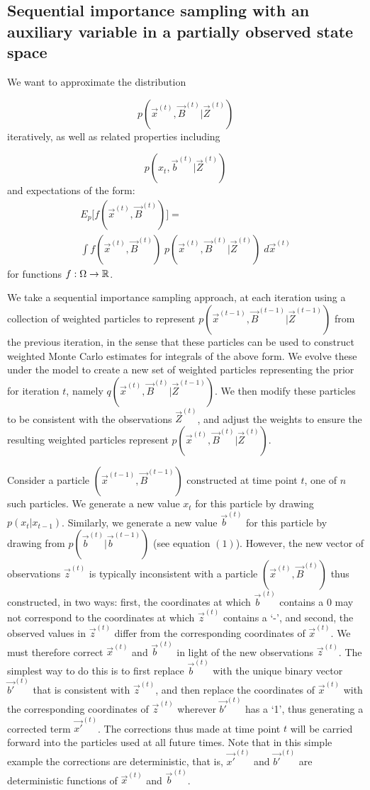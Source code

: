 \subsection{Sequential importance sampling with an auxiliary variable in a partially observed state space}

We want to approximate the distribution 

\[
p(\vec{x}^{(t)}, \vec{B}^{(t)} | \vec{Z}^{(t)})
\]
iteratively, as well as related properties including

\[
    p(x_{t}, \vec{b}^{(t)} | \vec{Z}^{(t)})
\]
and expectations of the form:
\begin{multline*}
E_{p} \Big[f(\vec{x}^{(t)}, \vec{B}^{(t)}) \Big] = \\
\int f(\vec{x}^{(t)}, \vec{B}^{(t)})\; p(\vec{x}^{(t)}, \vec{B}^{(t)} | \vec{Z}^{(t)})\; d\vec{x}^{(t)}
\end{multline*}
for functions $f: \Omega  \rightarrow \mathbb R$. 

We take a sequential importance sampling approach, at each iteration using a collection of weighted particles to represent $p(\vec{x}^{(t-1)}, \vec{B}^{(t-1)} | \vec{Z}^{(t-1)})$ from the previous iteration, in the sense that these particles can be used to construct weighted Monte Carlo estimates for integrals of the above form. We evolve these under the model to create a new set of weighted particles representing the prior for iteration $t$, namely $q(\vec{x}^{(t)}, \vec{B}^{(t)} | \vec{Z}^{(t-1)})$. We then modify these particles to be consistent with the observations $\vec{Z}^{(t)}$, and adjust the weights to ensure the resulting weighted particles represent $p(\vec{x}^{(t)}, \vec{B}^{(t)} | \vec{Z}^{(t)})$.

Consider a particle $(\vec{x}^{(t-1)},\vec{B}^{(t-1)})$ constructed at time point $t$, one of $n$ such particles. We generate a new value $x_t$ for this particle by drawing $p(x_t | x_{t-1})$. Similarly, we generate a new value $\vec{b}^{(t)}$ for this particle by drawing from $p(\vec{b}^{(t)} | \vec{b}^{(t-1)})$ (see equation $(1)$). However, the new vector of observations $\vec{z}^{(t)}$ is typically inconsistent with a particle $(\vec{x}^{(t)}, \vec{B}^{(t)})$ thus constructed, in two ways: first, the coordinates at which $\vec{b}^{(t)}$ contains a 0 may not correspond to the coordinates at which $\vec{z}^{(t)}$ contains a `-', and second, the observed values in $\vec{z}^{(t)}$ differ from the corresponding coordinates of $\vec{x}^{(t)}$. We must therefore correct $\vec{x}^{(t)}$ and $\vec{b}^{(t)}$ in light of the new observations $\vec{z}^{(t)}$. The simplest way to do this is to first replace $\vec{b}^{(t)}$ with the unique binary vector $\vec{b'}^{(t)}$ that is consistent with $\vec{z}^{(t)}$, and then replace the coordinates of $\vec{x}^{(t)}$ with the corresponding coordinates of $\vec{z}^{(t)}$ wherever $\vec{b'}^{(t)}$ has a `1', thus generating a corrected term $\vec{x'}^{(t)}$. The corrections thus made at time point $t$ will be carried forward into the particles used at all future times. Note that in this simple example the corrections are deterministic, that is, $\vec{x'}^{(t)}$ and $\vec{b'}^{(t)}$ are deterministic functions of $\vec{x}^{(t)}$ and $\vec{b}^{(t)}$. 


